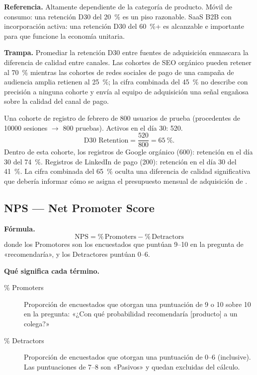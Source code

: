 \textbf{Referencia.} Altamente dependiente de la categoría de producto. Móvil de consumo:
una retención D30 del \qty{20}{\percent} es un piso razonable. SaaS B2B con incorporación
activa: una retención D30 del \qty{60}{\percent}+ es alcanzable e importante para que
funcione la economía unitaria.

\textbf{Trampa.} Promediar la retención D30 entre fuentes de adquisición enmascara la
diferencia de calidad entre canales. Las cohortes de SEO orgánico pueden retener al
\qty{70}{\percent} mientras las cohortes de redes sociales de pago de una campaña de
audiencia amplia retienen al \qty{25}{\percent}; la cifra combinada del \qty{45}{\percent}
no describe con precisión a ninguna cohorte y envía al equipo de adquisición una señal
engañosa sobre la calidad del canal de pago.

\begin{example}
Una cohorte de registro de febrero de \num{800} usuarios de prueba (procedentes de
\num{10000} sesiones $\to$ \num{800} pruebas). Activos en el día 30: \num{520}.
\[
  \text{D30 Retention} = \frac{520}{800} = \qty{65}{\percent}.
\]
Dentro de esta cohorte, los registros de Google orgánico (600): retención en el día 30 del
\qty{74}{\percent}. Registros de LinkedIn de pago (200): retención en el día 30 del
\qty{41}{\percent}. La cifra combinada del \qty{65}{\percent} oculta una diferencia de
calidad significativa que debería informar cómo se asigna el presupuesto mensual de
adquisición de .
\end{example}


\subsection{NPS --- Net Promoter Score}

\textbf{Fórmula.}
\[
  \mathrm{NPS} = \%\,\text{Promoters} - \%\,\text{Detractors}
\]
donde los Promotores son los encuestados que puntúan 9--10 en la pregunta de «recomendaría»,
y los Detractores puntúan 0--6.

\textbf{Qué significa cada término.}
\begin{description}
  \item[\% Promoters] Proporción de encuestados que otorgan una puntuación de 9 o 10 sobre
    10 en la pregunta: «¿Con qué probabilidad recomendaría [producto] a un colega?»
  \item[\% Detractors] Proporción de encuestados que otorgan una puntuación de 0--6
    (inclusive). Las puntuaciones de 7--8 son «Pasivos» y quedan excluidas del cálculo.
\end{description}

